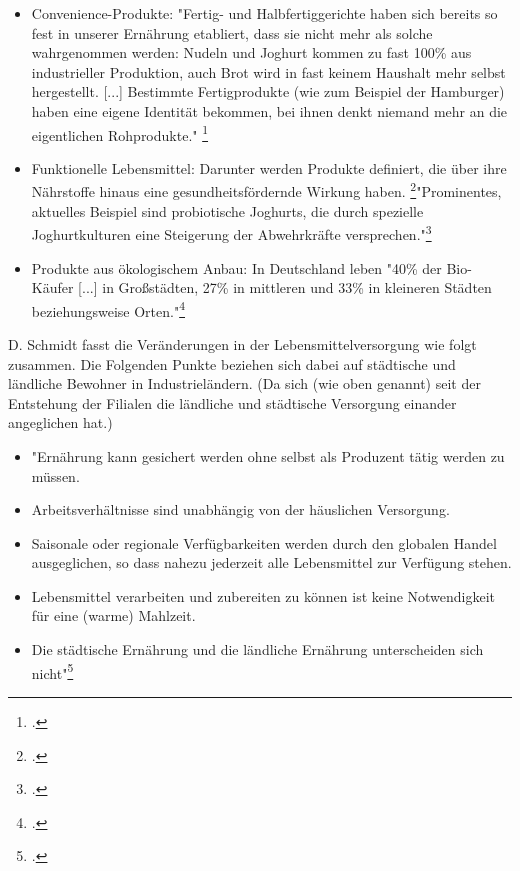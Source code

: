 \documentclass{scrartcl}
\begin{document}
 \begin{itemize}
\item Convenience-Produkte: "Fertig- und Halbfertiggerichte haben sich bereits so fest in unserer Ernährung etabliert, dass sie nicht mehr als solche wahrgenommen werden: Nudeln und Joghurt kommen zu fast 100\% aus industrieller Produktion, auch Brot wird in fast keinem Haushalt mehr selbst hergestellt. [...] Bestimmte Fertigprodukte (wie zum Beispiel der Hamburger)
haben eine eigene Identität bekommen, bei ihnen denkt niemand mehr an die eigentlichen Rohprodukte." \footcite{Escher2003EssenKultur}
\item Funktionelle Lebensmittel: Darunter werden Produkte definiert, die über ihre Nährstoffe hinaus eine gesundheitsfördernde Wirkung haben. \footcites[Vgl.][S.5]{Heasman1958-2001TheProfits}"Prominentes, aktuelles Beispiel sind probiotische Joghurts, die durch spezielle Joghurtkulturen eine Steigerung der Abwehrkräfte versprechen."\footcite[S.14]{Stierand2008StadtLebensmittel}
\item Produkte aus ökologischem Anbau: In Deutschland leben "40\% der Bio-Käufer [...] in Großstädten, 27\% in mittleren und 33\% in kleineren Städten beziehungsweise Orten."\footcite[S.14]{Stierand2008StadtLebensmittel}
\end{itemize}
D. Schmidt fasst die Veränderungen in der Lebensmittelversorgung wie folgt zusammen. Die Folgenden Punkte beziehen sich dabei auf städtische und ländliche Bewohner in Industrieländern. (Da sich (wie oben genannt) seit der Entstehung der Filialen die ländliche und städtische Versorgung einander angeglichen hat.)

\begin{itemize}

\item "Ernährung kann gesichert werden ohne selbst als Produzent tätig werden zu
müssen.
\item Arbeitsverhältnisse sind unabhängig von der häuslichen Versorgung.
\item Saisonale oder regionale Verfügbarkeiten werden durch den globalen Handel
ausgeglichen, so dass nahezu jederzeit alle Lebensmittel zur Verfügung stehen.
\item Lebensmittel verarbeiten und zubereiten zu können ist keine Notwendigkeit für
eine (warme) Mahlzeit.
\item Die städtische Ernährung und die ländliche Ernährung unterscheiden sich nicht"\footcite[S.20]{SchmidtDieVon}
\end{itemize}
\end{document}
